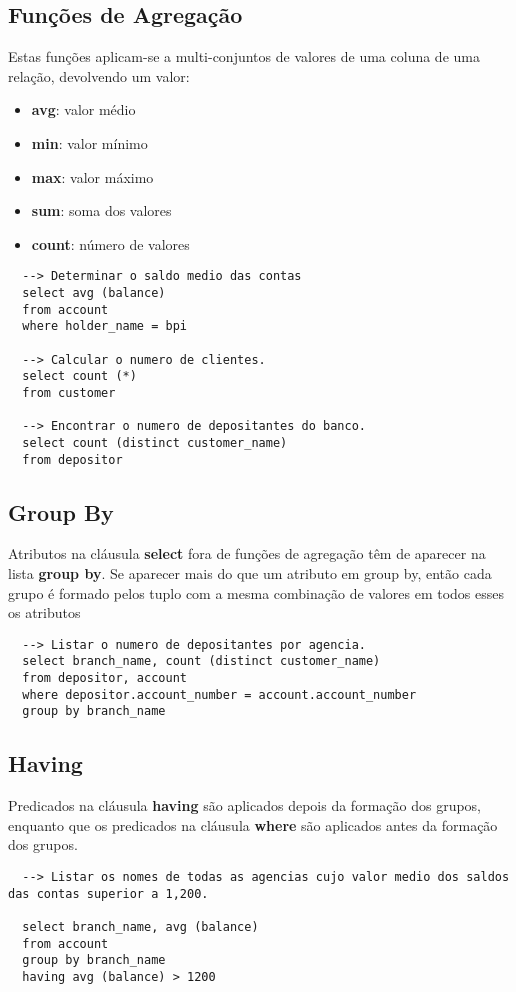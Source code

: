 \documentclass{article}
\begin{document}
\subsection{Funções de Agregação}
Estas funções aplicam-se a multi-conjuntos de valores de uma coluna de uma relação, devolvendo um valor:
\begin{itemize}
  \item \textbf{avg}: valor médio
  \item \textbf{min}: valor mínimo
  \item \textbf{max}: valor máximo
  \item \textbf{sum}: soma dos valores
  \item \textbf{count}: número de valores
\end{itemize}
\begin{lstlisting}
  --> Determinar o saldo medio das contas
  select avg (balance)
  from account
  where holder_name = bpi

  --> Calcular o numero de clientes.
  select count (*)
  from customer

  --> Encontrar o numero de depositantes do banco.
  select count (distinct customer_name)
  from depositor
\end{lstlisting}

\subsection{Group By}
Atributos na cláusula \textbf{select} fora de funções de agregação têm de aparecer na lista \textbf{group by}. Se aparecer mais do que um atributo em group by, então cada grupo é formado pelos tuplo com a mesma combinação de valores em todos esses os atributos
\begin{lstlisting}
  --> Listar o numero de depositantes por agencia.
  select branch_name, count (distinct customer_name)
  from depositor, account
  where depositor.account_number = account.account_number
  group by branch_name
\end{lstlisting}

\subsection{Having}
Predicados na cláusula \textbf{having} são aplicados depois da formação dos grupos, enquanto que os predicados na cláusula \textbf{where} são aplicados antes da formação dos grupos.
\begin{lstlisting}
  --> Listar os nomes de todas as agencias cujo valor medio dos saldos das contas superior a 1,200.

  select branch_name, avg (balance)
  from account
  group by branch_name
  having avg (balance) > 1200
\end{lstlisting}
\end{document}
